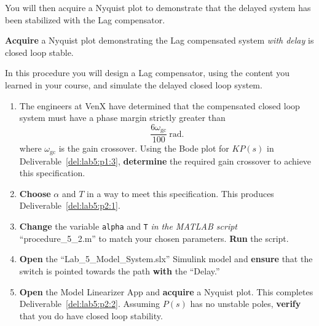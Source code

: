 %
You will then acquire a Nyquist plot to demonstrate that the delayed system has been stabilized with the Lag compensator.
%
\begin{deliverable}[label={del:lab5:p2:2}]
  \textbf{Acquire} a Nyquist plot demonstrating the Lag compensated system \emph{with delay} is closed loop stable.
\end{deliverable}
%
\begin{procedure}[label={proc:lab5:2}]
  In this procedure you will design a Lag compensator, using the content you learned in your course, and simulate the delayed closed loop system.
  \begin{enumerate}[label={(\arabic*)}]
    \item{%
      The engineers at VenX have determined that the compensated closed loop system must have a phase margin strictly greater than
      \[
        \frac{6\omega_\mathrm{gc}}{100}~\mathrm{rad}.
      \]
      where \(\omega_\mathrm{gc}\) is the gain crossover.
      Using the Bode plot for \(K P(s)\) in Deliverable~\ref{del:lab5:p1:3}, \textbf{determine} the required gain crossover to achieve this specification.
    }
    \item{%
      \textbf{Choose} \(\alpha\) and \(T\) in a way to meet this specification.
      This produces Deliverable~\ref{del:lab5:p2:1}.
    }
    \item{%
      \textbf{Change} the variable \texttt{alpha} and \texttt{T} \emph{in the MATLAB script} ``procedure\_5\_2.m'' to match your chosen parameters.
      \textbf{Run} the script.
    }
    \item{%
      \textbf{Open} the ``Lab\_5\_Model\_System.slx'' Simulink model and \textbf{ensure} that the switch is pointed towards the path \textbf{with} the ``Delay.''
    }
    \item{%
      \textbf{Open} the Model Linearizer App and \textbf{acquire} a Nyquist plot.
      This completes Deliverable~\ref{del:lab5:p2:2}.
      Assuming \(P(s)\) has no unstable poles, \textbf{verify} that you do  have closed loop stability.
    }
  \end{enumerate}
\end{procedure}


